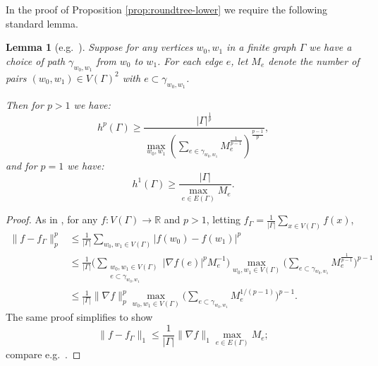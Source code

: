 \documentclass[11pt]{amsart}
\numberwithin{equation}{section}
\newtheorem{lemma}[equation]{Lemma}
\theoremstyle{citing}
\newcommand{\R}{\mathbb{R}}
\numberwithin{equation}{section}
\begin{document}
In the proof of Proposition \ref{prop:roundtree-lower} we require the following standard lemma.
\begin{lemma}[{e.g.\ \cite[Proof of Theorem 10.1]{HumeMackTess-Pprof}}]
	\label{lem:pathcounting}
		Suppose for any vertices $w_0,w_1$ in a finite graph $\Gamma$ we have a choice of path $\gamma_{w_0,w_1}$ from $w_0$ to $w_1$. For each edge $e$, let $M_e$ denote the number of pairs $(w_0,w_1) \in V(\Gamma)^2$ with $e \subset \gamma_{w_0,w_1}$.

		Then for $p>1$ we have:
\[
 h^p(\Gamma) \geq  \frac{|\Gamma|^{\frac1p}}{\max_{w_0,w_1}\left(\sum_{e\in\gamma_{w_0,w_1}} M_e^{\frac{1}{p-1}}\right)^{\frac{p-1}{p}}},
\]
		and for $p=1$ we have:
		\[
			h^1(\Gamma) \geq \frac{|\Gamma|}{\max_{e \in E(\Gamma)} M_e}.
		\]
	\end{lemma}
	\begin{proof}
		As in \cite[Proposition 10.3 and Proof of Theorem 10.1]{HumeMackTess-Pprof}, for any $f:V(\Gamma)\to \R$ and $p > 1$, letting $f_\Gamma = \frac{1}{|\Gamma|}\sum_{x \in V(\Gamma)}f(x)$,
		\begin{align*}
			\|f-f_\Gamma\|_p^p 
 			& \leq \frac{1}{|\Gamma|} \sum_{w_0,w_1 \in V(\Gamma)} |f(w_0)-f(w_1)|^p
			\\ & \leq \frac{1}{|\Gamma|} \Bigg( \sum_{\substack{w_0,w_1 \in V(\Gamma)\\ e \subset \gamma_{w_0,w_1}}} |\nabla f(e)|^p M_e^{-1}\Bigg) \max_{w_0,w_1 \in V(\Gamma)} \Bigg(\sum_{e \subset \gamma_{w_0,w_1}} M_e^{\frac{1}{p-1}}\Bigg)^{p-1}
			\\ & \leq \frac{1}{|\Gamma|} \|\nabla f\|_p^p \max_{w_0,w_1 \in V(\Gamma)} \Bigg(\sum_{e \subset \gamma_{w_0,w_1}} M_e^{1/(p-1)}\Bigg)^{p-1}.
		\end{align*}
		The same proof simplifies to show
		\[
			\|f-f_\Gamma\|_1 \leq \frac{1}{|\Gamma|} \|\nabla f\|_1 \max_{e \in E(\Gamma)} M_e;
		\]
		compare e.g.\ \cite[Proposition 1]{GladShum}.
	\end{proof}
\end{document}
